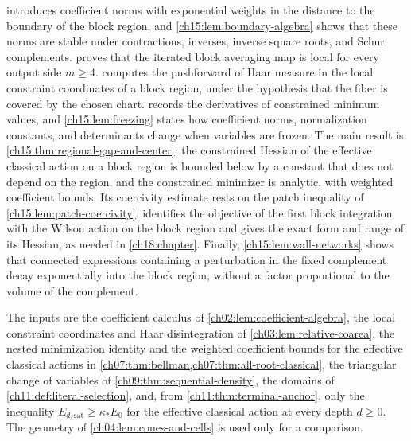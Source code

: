  introduces coefficient norms with exponential weights in the distance to the boundary of the block region, and \cref{ch15:lem:boundary-algebra} shows that these norms are stable under contractions, inverses, inverse square roots, and Schur complements.  proves that the iterated block averaging map is local for every output side $m\ge4$.  computes the pushforward of Haar measure in the local constraint coordinates of a block region, under the hypothesis that the fiber is covered by the chosen chart.  records the derivatives of constrained minimum values, and \cref{ch15:lem:freezing} states how coefficient norms, normalization constants, and determinants change when variables are frozen. The main result is \cref{ch15:thm:regional-gap-and-center}: the constrained Hessian of the effective classical action on a block region is bounded below by a constant that does not depend on the region, and the constrained minimizer is analytic, with weighted coefficient bounds. Its coercivity estimate rests on the patch inequality of \cref{ch15:lem:patch-coercivity}.  identifies the objective of the first block integration with the Wilson action on the block region and gives the exact form and range of its Hessian, as needed in \cref{ch18:chapter}. Finally, \cref{ch15:lem:wall-networks} shows that connected expressions containing a perturbation in the fixed complement decay exponentially into the block region, without a factor proportional to the volume of the complement.

The inputs are the coefficient calculus of \cref{ch02:lem:coefficient-algebra}, the local constraint coordinates and Haar disintegration of \cref{ch03:lem:relative-coarea}, the nested minimization identity and the weighted coefficient bounds for the effective classical actions in \cref{ch07:thm:bellman,ch07:thm:all-root-classical}, the triangular change of variables of \cref{ch09:thm:sequential-density}, the domains of \cref{ch11:def:literal-selection}, and, from \cref{ch11:thm:terminal-anchor}, only the inequality $E_{d,\mathrm{sat}}\ge\kappa_*E_0$ for the effective classical action at every depth $d\ge0$. The geometry of \cref{ch04:lem:cones-and-cells} is used only for a comparison.

